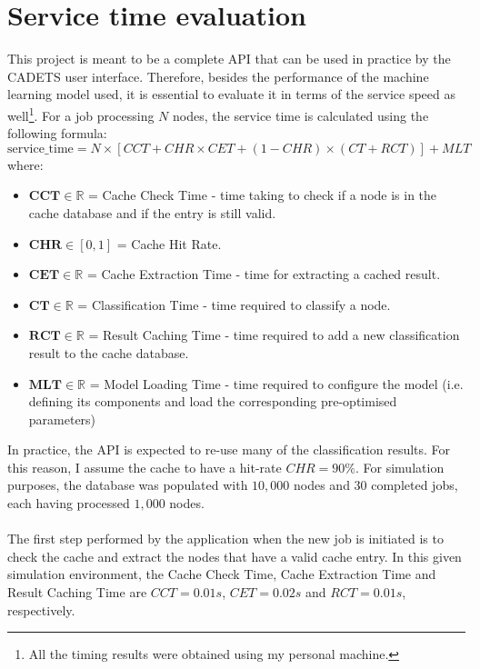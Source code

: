 		\section{Service time evaluation} \label{Section: eval/service-time}
			This project is meant to be a complete API that can be used in practice by the CADETS user interface. Therefore, besides the performance of the machine learning model used, it is essential to evaluate it in terms of the service speed as well\footnote{All the timing results were obtained using my personal machine.}. For a job processing $N$ nodes, the service time is calculated using the following formula:  
			\begin{equation}
				\text{service\_time} = N\times [CCT + CHR \times CET + (1-CHR) \times (CT + RCT)] + MLT
				\label{Eq: eval/service-time/overall}
			\end{equation}
			where: 
			\begin{itemize}
				\item $\mathbf{CCT} \in \mathbb{R}$ = Cache Check Time - time taking to check if a node is in the cache database and if the entry is still valid.
				\item $\mathbf{CHR} \in [0, 1]$ = Cache Hit Rate.
				\item $\textbf{CET} \in \mathbb{R}$ = Cache Extraction Time - time for extracting a cached result.
				\item $\textbf{CT} \in \mathbb{R}$ = Classification Time - time required to classify a node. 
				\item $\textbf{RCT} \in \mathbb{R}$ = Result Caching Time - time required to add a new classification result to the cache database.
				\item $\mathbf{MLT} \in \mathbb{R}$ = Model Loading Time - time required to configure the model (i.e. defining its components and load the corresponding pre-optimised parameters)
			\end{itemize}
			In practice, the API is expected to re-use many of the classification results. For this reason, I assume the cache to have a hit-rate $CHR = 90\%$. For simulation purposes, the database was populated with $10, 000$ nodes and $30$ completed jobs, each having processed $1, 000$ nodes. 
			\\ \\
			The first step performed by the application when the new job is initiated is to check the cache and extract the nodes that have a valid cache entry. In this given simulation environment, the Cache Check Time, Cache Extraction Time and Result Caching Time are $CCT=0.01s$, $CET=0.02s$ and $RCT=0.01s$, respectively.  
			

